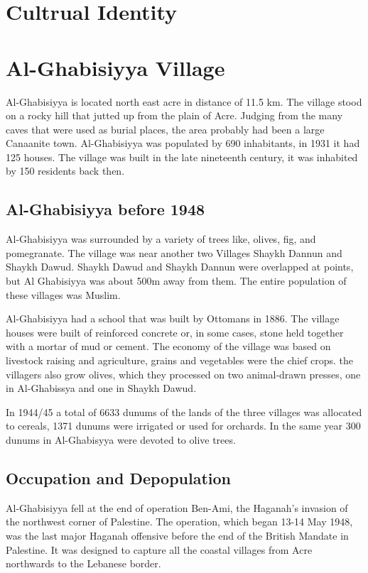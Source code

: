 \section{Cultrual Identity}

\section{Al-Ghabisiyya Village}

Al-Ghabisiyya is located north east acre in distance of 11.5 km. The village stood on a rocky hill that jutted up from the plain of Acre. Judging from the many caves that were used as burial places, the area probably had been a large Canaanite town.
Al-Ghabisiyya was populated by 690 inhabitants, in 1931 it had 125 houses. The village was built in the late nineteenth century, it was inhabited by 150 residents back then\citep{Khalidi2015}.
\subsection{Al-Ghabisiyya before 1948}

 Al-Ghabisiyya was surrounded by a variety of trees like, olives, fig, and pomegranate. The village was near another two Villages Shaykh Dannun and Shaykh Dawud. Shaykh Dawud and Shaykh Dannun were overlapped at points, but Al Ghabisiyya was about 500m away from them. The entire population of these villages was Muslim. 

Al-Ghabisiyya had a school that was built by Ottomans in 1886. The village houses were built of reinforced concrete or, in some cases, stone held together with a mortar of mud or cement. The economy of the village was based on livestock raising and agriculture, grains and vegetables were the chief crops. the villagers also grow olives, which they processed on two animal-drawn presses, one in Al-Ghabissya and one in Shaykh Dawud.

In 1944/45 a total of 6633 dunums of the lands of the three villages was allocated to cereals, 1371 dunums were irrigated or used for orchards. In the same year 300 dunums in Al-Ghabisyya were devoted to olive trees\citep{Khalidi2015}.

\subsection{Occupation and Depopulation}

Al-Ghabisiyya fell at the end of operation Ben-Ami, the Haganah's invasion of the northwest corner of Palestine. The operation, which began 13-14 May 1948, was the last major Haganah offensive before the end of the British Mandate in Palestine. It was designed to capture all the coastal villages from Acre northwards to the Lebanese border\citep{Khalidi2015}.


